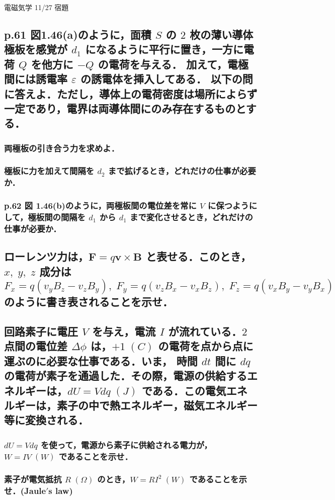 \documentclass[a4paper, 12pt]{bxjsarticle}
\begin{document}
\begin{center}
    \begin{huge}
        電磁気学 11/27 宿題
    \end{huge}
\end{center}

\begin{samepage}
\subsection{p.61 図1.46(a)のように，面積 \(S\) の \(2\) 枚の薄い導体極板を感覚が \(d_1\) になるように平行に置き，一方に電荷 \(Q\) を他方に \(-Q\) の電荷を与える．%
加えて，電極間には誘電率 \(\varepsilon\) の誘電体を挿入してある．%
以下の問に答えよ．ただし，導体上の電荷密度は場所によらず一定であり，電界は両導体間にのみ存在するものとする．}
\subsubsection{両極板の引き合う力を求めよ．}
\vspace{13em}
\subsubsection{極板に力を加えて間隔を \(d_2\) まで拡げるとき，どれだけの仕事が必要か．}
\vspace{13em}
\subsubsection{p.62 図 1.46(b)のように，両極板間の電位差を常に \(V\) に保つようにして，極板間の間隔を \(d_1\) から \(d_1\) まで変化させるとき，どれだけの仕事が必要か．}
\end{samepage}

\newpage
\subsection{ローレンツ力は，\(\boldsymbol{F}=q\boldsymbol{v}\times\boldsymbol{B}\) と表せる．このとき，\(x,\;y,\;z\) 成分は\[%
    F_x=q(v_yB_z-v_zB_y),\;F_y=q(v_zB_x-v_xB_z),\;F_z=q(v_xB_y-v_yB_x)\]のように書き表されることを示せ．}
\newpage

\subsection{回路素子に電圧 \(V\) を与え，電流 \(I\) が流れている．\(2\) 点間の電位差 \(\Delta \phi\) は，\(+1\;\si{(C)}\) の電荷を点から点に運ぶのに必要な仕事である．いま，%
時間 \(dt\) 間に \(dq\) の電荷が素子を通過した．その際，電源の供給するエネルギーは，\(dU = Vdq\;\si{(J)}\) である．この電気エネルギーは，素子の中で熱エネルギー，磁気エネルギー%
等に変換される．}
\subsubsection{\(dU=Vdq\) を使って，電源から素子に供給される電力が，\(W=IV\;\si{(W)}\) であることを示せ．}
\vspace{13em}
\subsubsection{素子が電気抵抗 \(R\;\si{(\Omega)}\) のとき，\(W=RI^2\;\si{(W)}\) であることを示せ．(Jaule\('\)s law)}
\end{document}
